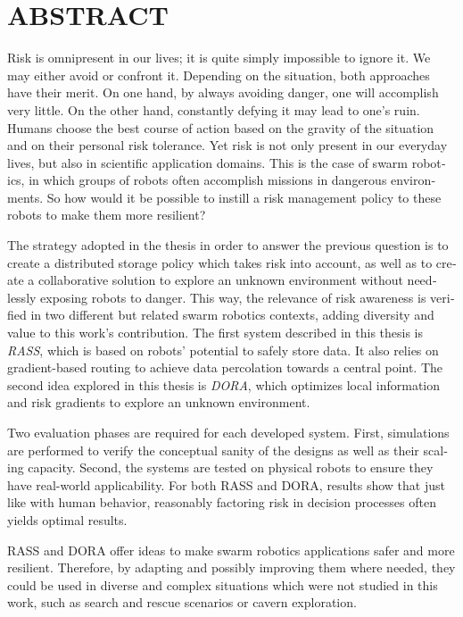 %

\chapter*{ABSTRACT}\thispagestyle{headings}
%
\begin{otherlanguage}{english}
Risk is omnipresent in our lives; it is quite simply impossible to ignore it. We may either avoid or confront it. Depending on the situation, both approaches have their merit. On one hand, by always avoiding danger, one will accomplish very little. On the other hand, constantly defying it may lead to one's ruin. Humans choose the best course of action based on the gravity of the situation and on their personal risk tolerance. Yet risk is not only present in our everyday lives, but also in scientific application domains. This is the case of swarm robotics, in which groups of robots often accomplish missions in dangerous environments. So how would it be possible to instill a risk management policy to these robots to make them more resilient?

The strategy adopted in the thesis in order to answer the previous question is to create a distributed storage policy which takes risk into account, as well as to create a collaborative solution to explore an unknown environment without needlessly exposing robots to danger. This way, the relevance of risk awareness is verified in two different but related swarm robotics contexts, adding diversity and value to this work's contribution. The first system described in this thesis is \textit{\acl{RASS}}, which is based on robots' potential to safely store data. It also relies on gradient-based routing to achieve data percolation towards a central point. The second idea explored in this thesis is \textit{\acl{DORA}}, which optimizes local information and risk gradients to explore an unknown environment.

Two evaluation phases are required for each developed system. First, simulations are performed to verify the conceptual sanity of the designs as well as their scaling capacity. Second, the systems are tested on physical robots to ensure they have real-world applicability. For both \ac{RASS} and \ac{DORA}, results show that just like with human behavior, reasonably factoring risk in decision processes often yields optimal results.

\ac{RASS} and \ac{DORA} offer ideas to make swarm robotics applications safer and more resilient. Therefore, by adapting and possibly improving them where needed, they could be used in diverse and complex situations which were not studied in this work, such as search and rescue scenarios or cavern exploration.

\end{otherlanguage}

